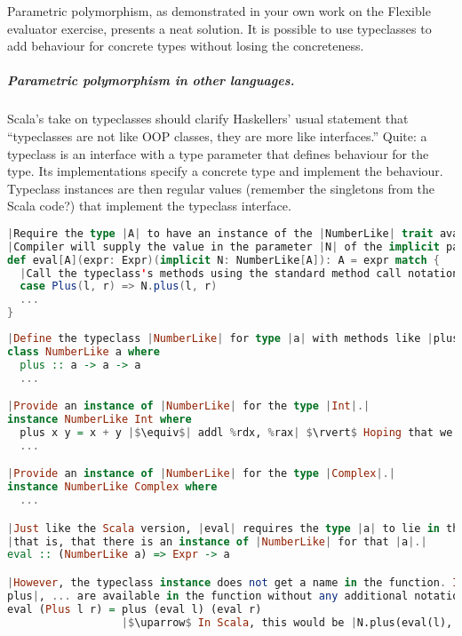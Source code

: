 \documentclass[10 pt]{article}
\begin{document}
Parametric polymorphism, as demonstrated in your own work on the Flexible evaluator exercise, presents a neat solution. It is possible to use typeclasses to add behaviour for concrete types without losing the concreteness.

\subparagraph{Parametric polymorphism in other languages.} Scala's take on typeclasses should clarify Haskellers' usual statement that ``typeclasses are not like OOP classes, they are more like interfaces.'' Quite: a typeclass is an interface with a type parameter that defines behaviour for the type. Its implementations specify a concrete type and implement the behaviour. Typeclass instances are then regular values (remember the singletons from the Scala code?) that implement the typeclass interface.

\begin{lstlisting}[language=Scala, escapechar=|]
|Require the type |A| to have an instance of the |NumberLike| trait available for it.|
|Compiler will supply the value in the parameter |N| of the implicit parameter list.|
def eval[A](expr: Expr)(implicit N: NumberLike[A]): A = expr match {
  |Call the typeclass's methods using the standard method call notation.|
  case Plus(l, r) => N.plus(l, r)
  ...
}
\end{lstlisting}

\begin{lstlisting}[language=Haskell, escapechar=|]
|Define the typeclass |NumberLike| for type |a| with methods like |plus|, ... .|
class NumberLike a where
  plus :: a -> a -> a
  ...

|Provide an instance of |NumberLike| for the type |Int|.|
instance NumberLike Int where
  plus x y = x + y |$\equiv$| addl %rdx, %rax| $\rvert$ Hoping that we have fastcall convention and the parameters are in |%rax| and |%rdx|.|
  ...

|Provide an instance of |NumberLike| for the type |Complex|.|
instance NumberLike Complex where
  ...

|Just like the Scala version, |eval| requires the type |a| to lie in the |NumberLike| typeclass;|
|that is, that there is an instance of |NumberLike| for that |a|.|
eval :: (NumberLike a) => Expr -> a

|However, the typeclass instance does not get a name in the function. Instead, all its functions|
plus|, ... are available in the function without any additional notation.|
eval (Plus l r) = plus (eval l) (eval r)
                  |$\uparrow$ In Scala, this would be |N.plus(eval(l), eval(r))
\end{lstlisting}
\end{document}
